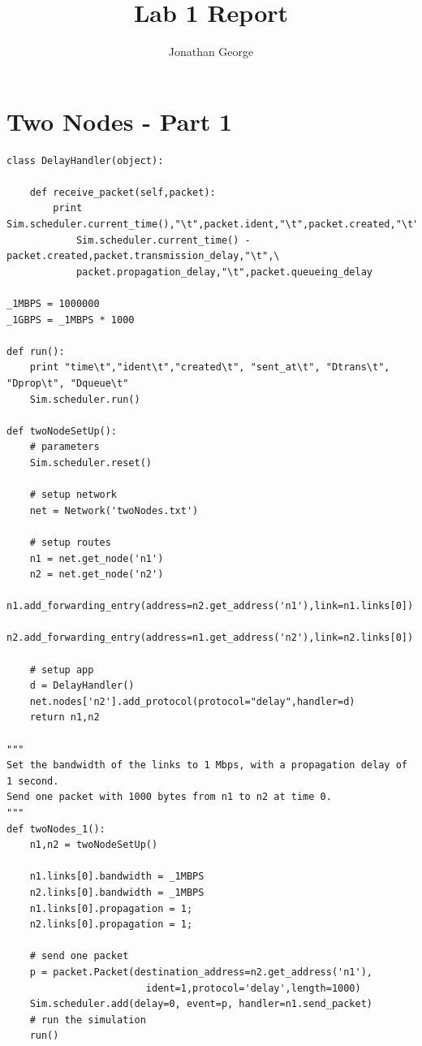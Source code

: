 \documentclass[11pt]{article}
\begin{document}
\lstset{
  language=Python,
  basicstyle=\small,          %
  keywordstyle=\bfseries,
  identifierstyle=,           %
  commentstyle=,              %
  stringstyle=\ttfamily,      %
  showstringspaces=false,     %
  numbers=left,
  numberstyle=\tiny,
  numbersep=5pt,
  frame=tb,
}

\title{Lab 1 Report}

\author{Jonathan George}

\date{}

\maketitle

\section{Two Nodes - Part 1}



\begin{lstlisting}
class DelayHandler(object):

    def receive_packet(self,packet):
        print Sim.scheduler.current_time(),"\t",packet.ident,"\t",packet.created,"\t",\
            Sim.scheduler.current_time() - packet.created,packet.transmission_delay,"\t",\
            packet.propagation_delay,"\t",packet.queueing_delay

_1MBPS = 1000000
_1GBPS = _1MBPS * 1000

def run():
    print "time\t","ident\t","created\t", "sent_at\t", "Dtrans\t", "Dprop\t", "Dqueue\t"
    Sim.scheduler.run()

def twoNodeSetUp():
    # parameters
    Sim.scheduler.reset()

    # setup network
    net = Network('twoNodes.txt')

    # setup routes
    n1 = net.get_node('n1')
    n2 = net.get_node('n2')
    n1.add_forwarding_entry(address=n2.get_address('n1'),link=n1.links[0])
    n2.add_forwarding_entry(address=n1.get_address('n2'),link=n2.links[0])

    # setup app
    d = DelayHandler()
    net.nodes['n2'].add_protocol(protocol="delay",handler=d)
    return n1,n2

"""
Set the bandwidth of the links to 1 Mbps, with a propagation delay of 1 second. 
Send one packet with 1000 bytes from n1 to n2 at time 0.
"""
def twoNodes_1():
    n1,n2 = twoNodeSetUp()

    n1.links[0].bandwidth = _1MBPS
    n2.links[0].bandwidth = _1MBPS
    n1.links[0].propagation = 1;
    n2.links[0].propagation = 1;

    # send one packet
    p = packet.Packet(destination_address=n2.get_address('n1'),
                        ident=1,protocol='delay',length=1000)
    Sim.scheduler.add(delay=0, event=p, handler=n1.send_packet)
    # run the simulation
    run()
\end{lstlisting}
\end{document}
